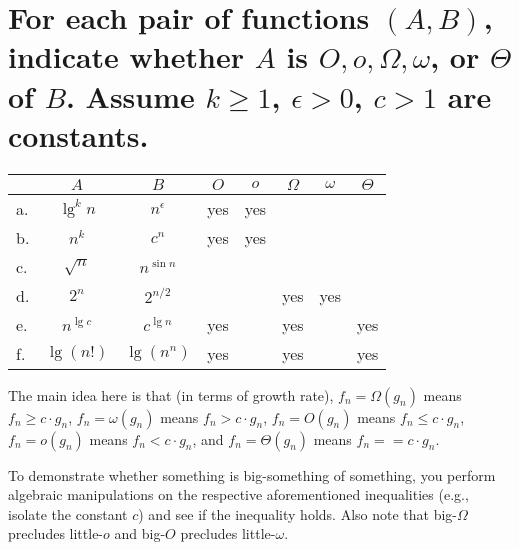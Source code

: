 \section[Problem 5]{For each pair of functions $(A, B)$, indicate whether $A$ is $O, o, \Omega, \omega$, or $\Theta$ of $B$. Assume $k \geq 1$, $\epsilon > 0$, $c > 1$ are constants.}
\begin{center}
	\begin{tabular}{lcc|c|c|c|c|c}
		& $A$ & $B$ & $O$ & $o$ & $\Omega$ & $\omega$ & $\Theta$ \\ \hline
		a. & $\lg^k n$ & $n^{\epsilon}$ & yes & yes &  &  &  \\ \hline
		b. & $n^k$ & $c^n$				& yes & yes &  &  &  \\ \hline
		c. & $\sqrt{n}$ & $n^{\sin n}$	&  &  &  &  &  \\ \hline
		d. & $2^n$ & $2^{n/2}$			&  &  & yes & yes &  \\ \hline
		e. & $n^{\lg c}$ & $c^{\lg n}$	& yes &  & yes &  & yes \\ \hline
		f. & $\lg(n!)$ & $\lg(n^n)$		& yes &  & yes &  & yes 
	\end{tabular}
\end{center}

The main idea here is that (in terms of growth rate), 
$f_n = \Omega(g_n)$ means	$f_n \geq c \cdot g_n$,
$f_n = \omega(g_n)$ means	$f_n > c \cdot g_n$,
$f_n = O(g_n)$ means		$f_n \leq c \cdot g_n$,
$f_n = o(g_n)$ means		$f_n < c \cdot g_n$, and
$f_n = \Theta(g_n)$ means	$f_n == c \cdot g_n$. 

To demonstrate whether something is big-something of something, you perform algebraic manipulations on the respective aforementioned inequalities (e.g., isolate the constant $c$) and see if the inequality holds. Also note that big-$\Omega$ precludes little-$o$ and big-$O$ precludes little-$\omega$.
